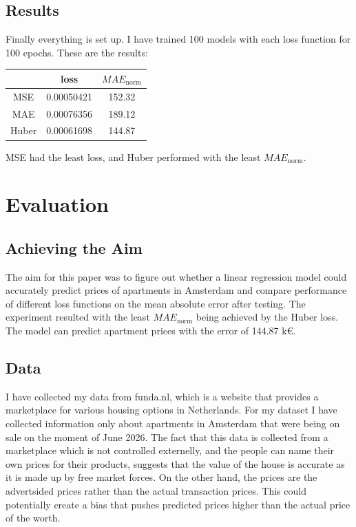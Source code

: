 \documentclass{article}
\begin{document}
\subsection{Results}

Finally everything is set up. I have trained 100 models with each loss function for
100 epochs. These are the results:


\begin{table}[H]
\centering
\begin{tabular}{c|c|c}
& loss & $MAE_{\mathrm{norm}}$ \\
\hline
MSE & 0.00050421 & 152.32 \\
\hline
MAE & 0.00076356 & 189.12 \\
\hline
Huber & 0.00061698 & 144.87 \\
\end{tabular}
\end{table}


MSE had the least loss, and Huber performed with the least $MAE_{\mathrm{norm}}$.


\section{Evaluation}


\subsection{Achieving the Aim}

The aim for this paper was to figure out whether a linear regression model could
accurately predict prices of apartments in Amsterdam and compare performance of
different loss functions on the mean absolute error after testing. The experiment
resulted with the least $MAE_{\mathrm{norm}}$ being achieved by the Huber loss.
The model can predict apartment prices with the error of 144.87 k\euro.



\subsection{Data}


I have collected my data from funda.nl, which is a website that provides a
marketplace for various housing options in Netherlands. For my dataset I have
collected information only about apartments in Amsterdam that were being on sale
on the moment of June 2026. The fact that this data is collected from a marketplace
which is not controlled externelly, and the people can name their own prices for
their products, suggests that the value of the house is accurate as it is made up
by free market forces. On the other hand, the prices are the advertsided prices
rather than the actual transaction prices. This could potentially create a
bias that pushes predicted prices higher than the actual price of the worth.
\end{document}
